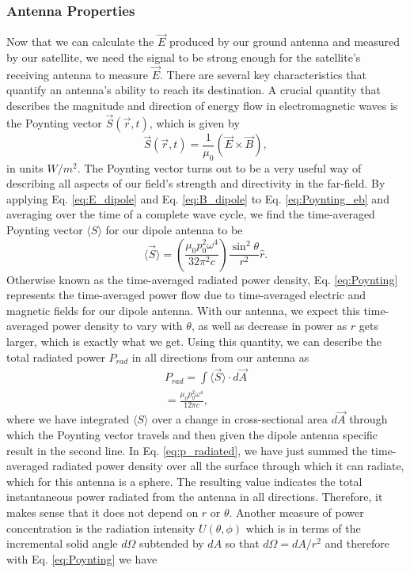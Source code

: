 \documentclass[10pt]{article}
\begin{document}
\subsubsection{Antenna Properties}
\label{ant_properties}

Now that we can calculate the $\vec{E}$ produced by our ground antenna and measured by our satellite, we need the signal to be strong enough for the satellite's receiving antenna to measure $\vec{E}$. There are several key characteristics that quantify an antenna's ability to reach its destination. A crucial quantity that describes the magnitude and direction of energy flow in electromagnetic waves is the Poynting vector $\vec{S}(\vec{r},t)$, which is given by
\begin{equation}
\vec{S}(\vec{r},t) = \frac{1}{\mu_0}(\vec{E}\times \vec{B}),
    \label{eq:Poynting_eb}
\end{equation}
in units $\si{W/m^2}$. The Poynting vector turns out to be a very useful way of describing all aspects of our field's strength and directivity in the far-field. By applying Eq. \ref{eq:E_dipole} and Eq. \ref{eq:B_dipole} to Eq. \ref{eq:Poynting_eb} and averaging over the time of a complete wave cycle, we find the time-averaged Poynting vector $\langle S\rangle$ for our dipole antenna to be
\begin{equation}
\langle \vec{S}\rangle = (\frac{\mu_0p_0^2\omega^4}{32 \pi^2 c})\frac{\sin^2\theta}{r^2}\hat{r}.
    \label{eq:Poynting}
\end{equation}
Otherwise known as the time-averaged radiated power density, Eq. \ref{eq:Poynting} represents the time-averaged power flow due to time-averaged electric and magnetic fields for our dipole antenna. With our antenna, we expect this time-averaged power density to vary with $\theta$, as well as decrease in power as $r$ gets larger, which is exactly what we get. Using this quantity, we can describe the total radiated power $P_{rad}$ in all directions from our antenna as
\begin{align}
P_{rad} = \int \langle \vec{S}\rangle \cdot d\vec{A} \\
= \frac{\mu_0p_0^2\omega^4}{12 \pi c},
    \label{eq:p_radiated}
\end{align}
where we have integrated $\langle S\rangle$ over a change in cross-sectional area $d\vec{A}$ through which the Poynting vector travels and then given the dipole antenna specific result in the second line. In Eq. \ref{eq:p_radiated}, we have just summed the time-averaged radiated power density over all the surface through which it can radiate, which for this antenna is a sphere. The resulting value indicates the total instantaneous power radiated from the antenna in all directions. Therefore, it makes sense that it does not depend on $r$ or $\theta$. Another measure of power concentration is the radiation intensity $U(\theta,\phi)$ which is in terms of the incremental solid angle $d\Omega$ subtended by $dA$ so that $d\Omega = dA/r^2$ and therefore with Eq. \ref{eq:Poynting} we have
\end{document}

